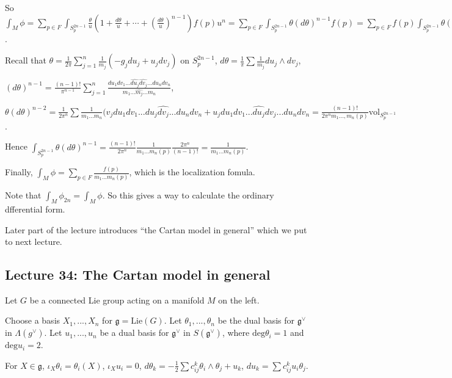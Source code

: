 \documentclass{article}
\theoremstyle{mystyle}
\theoremstyle{remark}
\numberwithin{equation}{section}
\begin{document}
So $\int_M \phi
=
\sum_{p\in F} \int_{S^{2n-1}_p} \frac{\theta}{u}\left(1+ \frac{d \theta}{u} + \cdots + \left(\frac{d \theta}{u} \right)^{n-1}\right) f(p)u^n
= \sum_{p\in F} \int_{S^{2n-1}_p} \theta (d\theta)^{n-1} f(p) = \sum_{p\in F} f(p) \int_{S^{2n-1}_p} \theta(d\theta)^{n-1}$.
 

Recall that $\theta = \frac{1}{2\pi} \sum_{j=1}^n \frac{1}{m_j}(-g_j du_j + u_j dv_j)$ on $S^{2n-1}_p$, $d\theta = \frac{1}{\pi} \sum \frac{1}{m_j} du_j \wedge dv_j$, 

$(d\theta)^{n-1} = \frac{(n-1)!}{\pi^{n-1}}  \sum_{j=1}^n \frac{du_1dv_1...\hat{du_j}\hat{dv_j}...du_ndv_n}{m_1...\hat{m_j}...m_n}$, 

$\theta(d\theta)^{n-2} = \frac{1}{2\pi^n} \sum
\frac{1}{m_1...m_n} (v_j du_1dv_1...du_j \hat{dv_j}...du_ndv_n
+u_j du_1dv_1 ...\hat{du_j} dv_j ...du_n dv_n = \frac{(n-1)!}{2\pi^nm_1...,m_n(p)} \text{vol}_{S^{2n-1}_p}$.

Hence $\int_{S^{2n-1}_p} \theta (d\theta)^{n-1} = \frac{(n-1)!}{2\pi^n} \frac{1}{m_1...m_n(p)} \frac{2\pi^n}{(n-1)!} = \frac{1}{m_1...m_n(p)}$. 


Finally, $\int_M\phi = \sum\limits_{p\in F} \frac{f(p)}{m_1...m_n(p)}$, which is the localization fomula. 

Note that $\int_M\phi_{2n} = \int_M\phi$. So this gives a way to calculate the ordinary dfferential form.


Later part of the lecture introduces ``the Cartan model in general'' which we put to next lecture.








\subsection{Lecture 34: The Cartan model in general}



Let $G$ be a connected Lie group acting on a manifold $M$ on the left.

Choose a basis $X_1,...,X_n$ for $\mathfrak{g} = \mathrm{Lie}(G)$. Let $\theta_1,...,\theta_n$ be the dual basis for $\mathfrak{g}^\vee$  in $\Lambda(g^\vee)$. Let $u_1,...,u_n$ be a dual basis for $\mathfrak{g}^\vee$ in $S(\mathfrak{g}^\vee)$, where $\mathrm{deg}\theta_i=1$ and $\mathrm{deg}u_i=2$. 

For $X \in \mathfrak{g}$, $\iota_X \theta_i = \theta_i(X)$, $\iota_X u_i = 0$, $d\theta_k = - \frac{1}{2} \sum c^k_{ij}\theta_i\wedge \theta_j + u_k$, $du_k = \sum c_{ij}^k u_i \theta_j$. 
\end{document}
